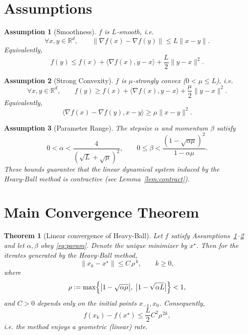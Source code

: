 \documentclass[11pt]{article}
\newtheorem{assumption}{Assumption}
\newtheorem{theorem}{Theorem}
\newcommand{\norm}[1]{\left\lVert#1\right\rVert}
\begin{document}
\newpage
\section*{Assumptions}
\begin{assumption}[Smoothness]\label{ass:smooth}
$f$ is $L$‑smooth, i.e.
\[
\forall x,y\in\mathbb{R}^d,\qquad
\|\nabla f(x)-\nabla f(y)\|\le L\|x-y\|.
\]
Equivalently,
\[
f(y)\le f(x)+\langle\nabla f(x),y-x\rangle+\frac{L}{2}\|y-x\|^2 .
\]
\end{assumption}

\begin{assumption}[Strong Convexity]\label{ass:strong}
$f$ is $\mu$‑strongly convex ($0<\mu\le L$), i.e.
\[
\forall x,y\in\mathbb{R}^d,\qquad
f(y)\ge f(x)+\langle\nabla f(x),y-x\rangle+\frac{\mu}{2}\|y-x\|^2 .
\]
Equivalently,
\[
\langle\nabla f(x)-\nabla f(y),x-y\rangle\ge \mu\|x-y\|^2 .
\]
\end{assumption}

\begin{assumption}[Parameter Range]\label{ass:param}
The stepsize $\alpha$ and momentum $\beta$ satisfy
\begin{equation}\label{eq:param}
0<\alpha<\frac{4}{(\sqrt{L}+\sqrt{\mu})^{2}},\qquad
0\le\beta<\frac{(1-\sqrt{\alpha\mu})^{2}}{1-\alpha\mu}.
\end{equation}
These bounds guarantee that the linear dynamical system induced by the Heavy‑Ball method is contractive (see Lemma~\ref{lem:contract}).
\end{assumption}

\section*{Main Convergence Theorem}
\begin{theorem}[Linear convergence of Heavy‑Ball]\label{thm:linear}
Let $f$ satisfy Assumptions~\ref{ass:smooth}–\ref{ass:strong} and let $\alpha,\beta$ obey \eqref{eq:param}.  
Denote the unique minimizer by $x^{\star}$. Then for the iterates generated by the Heavy‑Ball method,
\[
\boxed{
\norm{x_k-x^{\star}}\le C\,\rho^{\,k},\qquad k\ge 0,
}
\]
where
\[
\rho:=\max\Bigl\{\bigl|1-\sqrt{\alpha\mu}\bigr|,\;\bigl|1-\sqrt{\alpha L}\bigr|\Bigr\}<1,
\]
and $C>0$ depends only on the initial points $x_{-1},x_0$.
Consequently,
\[
f(x_k)-f(x^{\star})\le \frac{L}{2}C^{2}\rho^{\,2k},
\]
i.e. the method enjoys a geometric (linear) rate.
\end{theorem}
\end{document}
